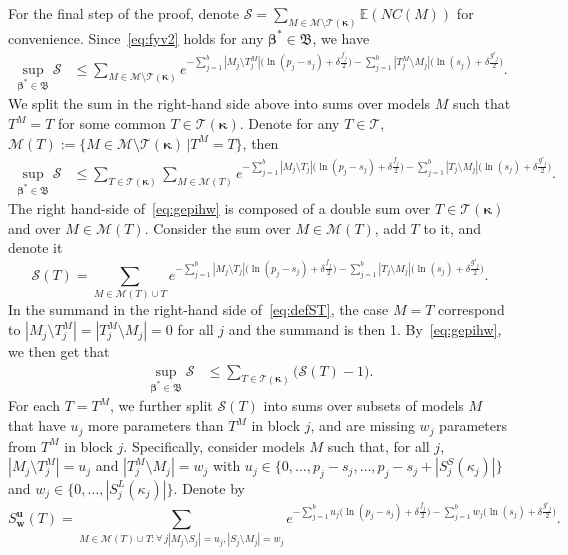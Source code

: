 \documentclass[
  12pt]{article}
\newcommand{\E}{\mathbb{E}}
\newcommand{\M}{\mathcal{M}}
\newcommand{\T}{\mathcal{T}}
\newcommand{\bu}{\mathbf{u}}
\newcommand{\bw}{\mathbf{w}}
\newcommand{\bbeta}{\boldsymbol{\beta}}
\newcommand{\bB}{\mathfrak{B}}
\newcommand{\bkappa}{\boldsymbol{\kappa}}
\begin{document}
For the final step of the proof, denote $\mathcal{S}= \sum_{M \in \M\setminus \T(\bkappa)} \E\left(NC(M)\right)$ for convenience. Since~\eqref{eq:fyv2} holds for any $\bbeta^*\in\bB$, we have
\begin{align*}
    \sup_{\bbeta^*\in\bB }\mathcal{S} &\leq \sum_{M \in \M\setminus \T(\bkappa)}e^{- \sum_{j=1}^b |M_j\setminus T^M_j|\big(\ln(p_j-s_j)+\delta \tfrac{f_j}{2}\big)-\sum_{j=1}^b |T^M_j\setminus M_j|\big(\ln(s_j)+\delta \tfrac{g'_j}{2}\big)}.
\end{align*}
We split the sum in the right-hand side above into sums over models $M$
such that $T^M=T$ for some common $T\in \T(\bkappa)$. Denote for any $T\in \T$, $\M(T):=\{M \in \M\setminus \T(\bkappa) \,| T^M=T\}$, then
\begin{align}\label{eq:gepihw}
    \sup_{\bbeta^*\in\bB }\mathcal{S} &\leq \sum_{T \in \T(\bkappa)}\sum_{M \in \M(T)}e^{- \sum_{j=1}^b |M_j\setminus T_j|\big(\ln(p_j-s_j)+\delta \tfrac{f_j}{2}\big)-\sum_{j=1}^b |T_j\setminus M_j|\big(\ln(s_j)+\delta \tfrac{g'_j}{2}\big)}.
\end{align}
The right hand-side of~\eqref{eq:gepihw} is composed of a double sum over $T \in \T(\bkappa)$ and over $M \in \M(T)$. Consider the sum over $M \in \M(T)$, add $T$ to it, and denote it
\begin{equation}\label{eq:defST}
  \mathcal{S}(T)=\sum_{M \in \M(T) \cup T}e^{- \sum_{j=1}^b |M_j\setminus T_j|\big(\ln(p_j-s_j)+\delta \tfrac{f_j}{2}\big)-\sum_{j=1}^b |T_j\setminus M_j|\big(\ln(s_j)+\delta \tfrac{g'_j}{2}\big)}.
\end{equation}
In the summand in the right-hand side of~\eqref{eq:defST}, the case $M=T$ correspond to $|M_j\setminus T^M_j|=|T^M_j\setminus M_j|=0$ for all $j$ and the summand is then 1.
By~\eqref{eq:gepihw}, we then get that
\begin{align}\label{eq:gepihw2}
    \sup_{\bbeta^*\in\bB}\mathcal{S} &\leq \sum_{T \in \T(\bkappa)}\big(\mathcal{S}(T)-1\big).
\end{align}
For each $T=T^M$, we further split $\mathcal{S}(T)$ into sums over subsets of models $M$ that have $u_j$ more parameters than $T^M$ in block $j$, and are missing $w_j$ parameters from $T^M$ in block $j$.
Specifically, consider models $M$ such that, for all $j$, $|M_j\setminus T^M_j|=u_j$ and $|T^M_j\setminus M_j|=w_j$ with $u_j \in \{0,\ldots,p_j-s_j,\ldots,p_j-s_j+|S_j^{S}(\kappa_j)|\}$ and $w_j \in \{0,\ldots,|S_j^{L}(\kappa_j)|\}$. Denote by
$$S^{\bu}_{\bw}(T)=\sum_{M \in \M(T) \cup T:\forall \,j |M_j\setminus S_j|=u_j, |S_j\setminus M_j|=w_j } e^{- \sum_{j=1}^b u_j\big(\ln(p_j-s_j)+\delta \tfrac{f_j}{2}\big)-\sum_{j=1}^b w_j\big(\ln(s_j)+\delta \tfrac{g'_j}{2}\big)}.$$
\end{document}
